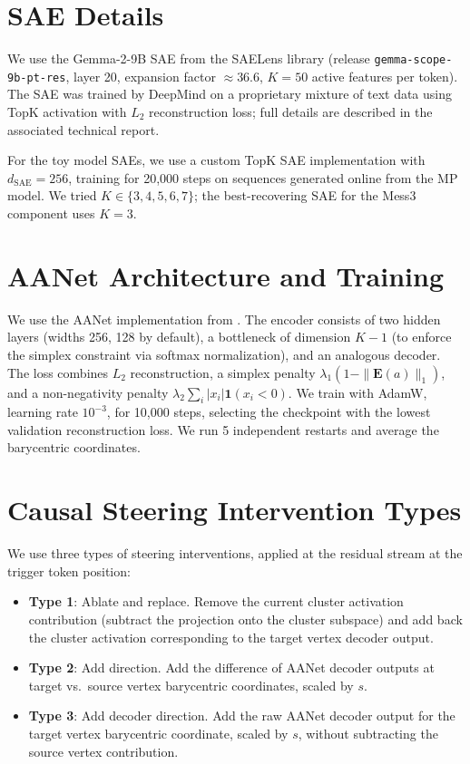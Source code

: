 \documentclass{article}
\begin{document}
\section{SAE Details}
\label{app:sae}

We use the Gemma-2-9B SAE from the SAELens library (release
\texttt{gemma-scope-9b-pt-res}, layer 20, expansion factor $\approx 36.6$, $K = 50$
active features per token).  The SAE was trained by DeepMind on a proprietary mixture
of text data using TopK activation with $L_2$ reconstruction loss; full details are
described in the associated technical report.

For the toy model SAEs, we use a custom TopK SAE implementation with $d_{\mathrm{SAE}}
= 256$, training for 20{,}000 steps on sequences generated online from the MP model.
We tried $K \in \{3, 4, 5, 6, 7\}$; the best-recovering SAE for the Mess3 component
uses $K = 3$.

\section{AANet Architecture and Training}
\label{app:aanet}

We use the AANet implementation from \citet{korem2019finding}.  The encoder consists
of two hidden layers (widths 256, 128 by default), a bottleneck of dimension $K-1$
(to enforce the simplex constraint via softmax normalization), and an analogous
decoder.  The loss combines $L_2$ reconstruction, a simplex penalty
$\lambda_1 (1 - \|\mathbf{E}(a)\|_1)$, and a non-negativity penalty
$\lambda_2 \sum_i |x_i| \mathbf{1}(x_i < 0)$.  We train with AdamW,
learning rate $10^{-3}$, for 10{,}000 steps, selecting the checkpoint with the
lowest validation reconstruction loss.  We run 5 independent restarts and average
the barycentric coordinates.

\section{Causal Steering Intervention Types}
\label{app:steering_types}

We use three types of steering interventions, applied at the residual stream at the
trigger token position:

\begin{itemize}
  \item \textbf{Type 1}: Ablate and replace.  Remove the current cluster activation
    contribution (subtract the projection onto the cluster subspace) and add back the
    cluster activation corresponding to the target vertex decoder output.
  \item \textbf{Type 2}: Add direction.  Add the difference of AANet decoder outputs
    at target vs.\ source vertex barycentric coordinates, scaled by $s$.
  \item \textbf{Type 3}: Add decoder direction.  Add the raw AANet decoder output
    for the target vertex barycentric coordinate, scaled by $s$, without subtracting
    the source vertex contribution.
\end{itemize}
\end{document}
